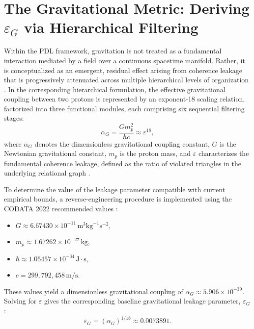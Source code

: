 \documentclass[11pt,a4paper]{article}
\newcommand{\eps}{\varepsilon}
\begin{document}
\section{The Gravitational Metric: Deriving \texorpdfstring{$\eps_G$}{epsilon	extsubscript{G}} via Hierarchical Filtering}

Within the PDL framework, gravitation is not treated as a fundamental interaction mediated by a field over a continuous spacetime manifold. Rather, it is conceptualized as an emergent, residual effect arising from coherence leakage that is progressively attenuated across multiple hierarchical levels of organization \cite{Exponent_18_PDL_2026}. In the corresponding hierarchical formulation, the effective gravitational coupling between two protons is represented by an exponent-18 scaling relation, factorized into three functional modules, each comprising six sequential filtering stages:
\begin{equation}
    \alpha_G = \frac{G m_p^2}{\hbar c} \approx \varepsilon^{18},
\end{equation}
where $\alpha_G$ denotes the dimensionless gravitational coupling constant, $G$ is the Newtonian gravitational constant, $m_p$ is the proton mass, and $\varepsilon$ characterizes the fundamental coherence leakage, defined as the ratio of violated triangles in the underlying relational graph \cite{Exponent_18_PDL_2026, Topological_Reformulation_PDL_2026}.

To determine the value of the leakage parameter compatible with current empirical bounds, a reverse-engineering procedure is implemented using the CODATA 2022 recommended values \cite{CODATA_2022}:
\begin{itemize}
    \item $G \approx 6.67430 \times 10^{-11} \, \text{m}^3 \text{kg}^{-1} \text{s}^{-2}$,
    \item $m_p \approx 1.67262 \times 10^{-27} \, \text{kg}$,
    \item $\hbar \approx 1.05457 \times 10^{-34} \, \text{J}\cdot\text{s}$,
    \item $c = 299{,}792{,}458 \, \text{m/s}$.
\end{itemize}

These values yield a dimensionless gravitational coupling of $\alpha_G \approx 5.906 \times 10^{-39}$. Solving for $\varepsilon$ gives the corresponding baseline gravitational leakage parameter, $\varepsilon_G$:
\begin{equation}
    \varepsilon_G = (\alpha_G)^{1/18} \approx 0.0073891.
\end{equation}
\end{document}
